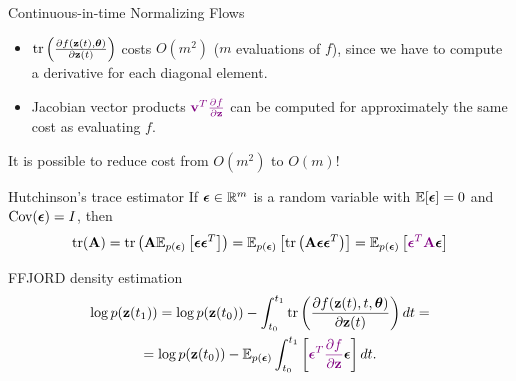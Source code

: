 \begin{frame}{Continuous-in-time Normalizing Flows}
	\vspace{0.2cm}
	\begin{itemize}
		\item $\text{tr} \left( \frac{\partial f(\mathbf{z}(t), \boldsymbol{\theta})}{\partial \mathbf{z}(t)} \right)$ costs $O(m^2)$ ($m$
		evaluations of $f$), since we have to compute a derivative for each diagonal element. 
		\item Jacobian vector products ${\color{violet}\mathbf{v}^T \frac{\partial f}{\partial \mathbf{z}}}$ can be computed for approximately the same cost as evaluating $f$.
	\end{itemize}
	It is possible to reduce cost from $O(m^2)$ to $O(m)$!
	\begin{block}{Hutchinson's trace estimator}
		If $\boldsymbol{\epsilon} \in \mathbb{R}^m$ is a random variable with $\mathbb{E} [\boldsymbol{\epsilon}] = 0$ and $\text{Cov} (\boldsymbol{\epsilon}) = I$, then
		\vspace{-0.3cm}
		\[
		    \text{tr}(\mathbf{A}) = \text{tr}\left(\mathbf{A}\mathbb{E}_{p(\boldsymbol{\epsilon})} \left[ \boldsymbol{\epsilon} \boldsymbol{\epsilon}^T \right]\right) =  \mathbb{E}_{p(\boldsymbol{\epsilon})} \left[  \text{tr}\left(  \mathbf{A}  \boldsymbol{\epsilon} \boldsymbol{\epsilon}^T \right) \right] =  \mathbb{E}_{p(\boldsymbol{\epsilon})} \left[ {\color{violet} \boldsymbol{\epsilon}^T \mathbf{A}} \boldsymbol{\epsilon}  \right]
		\]
		\vspace{-0.6 cm}
	\end{block}
	\begin{block}{FFJORD density estimation}
		\vspace{-0.8cm}
		\begin{multline*}
		    \log p(\mathbf{z}(t_1)) = \log p(\mathbf{z}(t_0)) - \int_{t_0}^{t_1} \text{tr}  \left( \frac{\partial f (\mathbf{z}(t), t, \boldsymbol{\theta})}{\partial \mathbf{z}(t)} \right) dt = \\ = \log p(\mathbf{z}(t_0)) - \mathbb{E}_{p(\boldsymbol{\epsilon})} \int_{t_0}^{t_1} \left[ {\color{violet}\boldsymbol{\epsilon}^T \frac{\partial f}{\partial \mathbf{z}}} \boldsymbol{\epsilon} \right] dt.
		\end{multline*}
	\end{block}
\end{frame}
